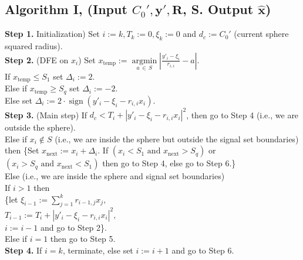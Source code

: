 \documentclass[english,12pt,a4paper,pdftex,sci,utf8]{aaltothesis}
\begin{document}
\newpage
\subsection*{Algorithm I, (Input $C_0', \mathbf{y'}, \mathbf{R}$, S. Output $\mathbf{\hat{x}}$)}
\label{sec:alg1}
\textbf{Step 1.} Initialization) Set $i := k, T_k := 0, \xi_k := 0$ and $d_c := C_0'$ (current sphere 
\indent squared radius). \\

\noindent \textbf{Step 2.} (DFE on $x_i$) Set $x_{\text{temp}} :=\underset{a\,\in\,S}{\operatorname{argmin}}\left|\frac{y'_i - \xi_i}{r_{i,i}} - a \right|$. \\
\indent If $x_{\text{temp}} \leq S_1$ set $\Delta_i := 2$. \\
\indent Else if $x_{\text{temp}} \geq S_{q}$ set $\Delta_i := -2$. \\
\indent Else set $\Delta_i := 2 \cdot \operatorname{sign}\left(y'_i-\xi_i-r_{i,i}x_i\right)$. \\

\noindent \textbf{Step 3.} (Main step) If $d_c < T_i + \left|y'_i-\xi_i-r_{i,i}x_i\right|^2$, then go to Step 4 (i.e., we are\\
\indent outside the sphere).\\
\indent Else if $x_i \not\in S$ (i.e., we are inside the sphere but outside the signal set boundaries) \\ 
\indent then \{Set $x_{\text{next}} := x_i + \Delta_i$. If $(x_i < S_1\,\, \text{and}\,\, x_{\text{next}} > S_q)$ or \\
\indent $(x_i > S_q\,\, \text{and}\,\, x_{\text{next}} < S_{1})$ then go to Step 4, else go to Step 6.\}  \\
\indent Else (i.e., we are inside the sphere and signal set boundaries) \\
\indent\indent If $i > 1$ then \\
\indent\indent\indent \{let $\xi_{i-1} := \sum_{j=1}^{k} r_{i-1,j}x_j,$\\ 
\indent\indent\indent $T_{i-1} := T_i + \left|y'_i-\xi_i-r_{i,i}x_i\right|^2,$\\
\indent\indent\indent $i := i - 1$ and go to Step 2\}. \\
\indent\indent Else if $i=1$ then go to Step 5. \\

\noindent \textbf{Step 4.} If $i = k$, terminate, else set $i := i+1$ and go to Step 6.\\
\end{document}

